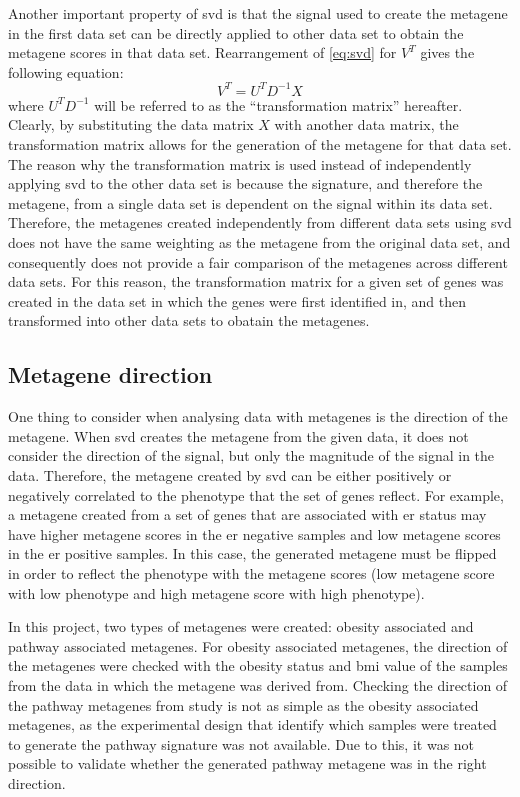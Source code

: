 Another important property of \gls{svd} is that the signal used to create the metagene in the first data set can be directly applied to other data set to obtain the metagene scores in that data set.
Rearrangement of \cref{eq:svd} for $V^T$ gives the following equation:
\begin{equation}
	\label{eq:transmat}
	V^T = U^{T}D^{-1}X
\end{equation}
where $U^{T}D^{-1}$ will be referred to as the ``transformation matrix'' hereafter.
Clearly, by substituting the data matrix $X$ with another data matrix, the transformation matrix allows for the generation of the metagene for that data set.
The reason why the transformation matrix is used instead of independently applying \gls{svd} to the other data set is because the signature, and therefore the metagene, from a single data set is dependent on the signal within its data set.
Therefore, the metagenes created independently from different data sets using \gls{svd} does not have the same weighting as the metagene from the original data set, and consequently does not provide a fair comparison of the metagenes across different data sets.
For this reason, the transformation matrix for a given set of genes was created in the data set in which the genes were first identified in, and then transformed into other data sets to obatain the metagenes.

\subsection{Metagene direction}
\label{sub:metagene_direction}

One thing to consider when analysing data with metagenes is the direction of the metagene.
When \gls{svd} creates the metagene from the given data, it does not consider the direction of the signal, but only the magnitude of the signal in the data.
Therefore, the metagene created by \gls{svd} can be either positively or negatively correlated to the phenotype that the set of genes reflect.
For example, a metagene created from a set of genes that are associated with \gls{er} status may have higher metagene scores in the \gls{er} negative samples and low metagene scores in the \gls{er} positive samples.
In this case, the generated metagene must be flipped in order to reflect the phenotype with the metagene scores (low metagene score with low phenotype and high metagene score with high phenotype).

In this project, two types of metagenes were created: obesity associated and pathway associated metagenes.
For obesity associated metagenes, the direction of the metagenes were checked with the obesity status and \gls{bmi} value of the samples from the data in which the metagene was derived from.
Checking the direction of the pathway metagenes from \citet{Gatza2010a} study is not as simple as the obesity associated metagenes, as the experimental design that identify which samples were treated to generate the pathway signature was not available.
Due to this, it was not possible to validate whether the generated pathway metagene was in the right direction.

